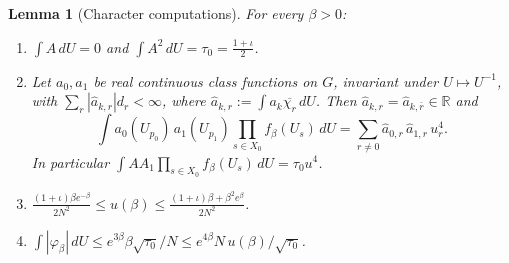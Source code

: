 \documentclass[11pt,a4paper]{article}
\newtheorem{lemma}[theorem]{Lemma}
\theoremstyle{definition}
\theoremstyle{remark}
\newcommand{\R}{\mathbb{R}}
\newcommand{\dU}{\,dU}
\begin{document}
\begin{lemma}[Character computations]\label{mg:lem:char}
For every $\beta>0$:
\begin{enumerate}[label=(\roman*)]
\item $\int A\dU=0$ and $\int A^2\dU=\tau_0=\frac{1+\iota}2$.
\item Let $a_0,a_1$ be real continuous class functions on $G$, invariant under $U\mapsto U^{-1}$, with $\sum_r|\hat a_{k,r}|d_r<\infty$,
where $\hat a_{k,r}:=\int a_k\overline{\chi_r}\dU$. Then $\hat a_{k,r}=\hat a_{k,\bar r}\in\R$ and
\[
\int a_0(U_{p_0})\,a_1(U_{p_1})\prod_{s\in X_0}f_\beta(U_s)\dU=\sum_{r\neq0}\hat a_{0,r}\,\hat a_{1,r}\,u_r^4 .
\]
In particular $\int AA_1\prod_{s\in X_0}f_\beta(U_s)\dU=\tau_0u^4$.
\item $\frac{(1+\iota)\beta e^{-\beta}}{2N^2}\le u(\beta)\le\frac{(1+\iota)\beta+\beta^2e^\beta}{2N^2}$.
\item $\int|\varphi_\beta|\dU\le e^{3\beta}\beta\sqrt{\tau_0}/N\le e^{4\beta}N\,u(\beta)/\sqrt{\tau_0}$.
\end{enumerate}
\end{lemma}
\end{document}

